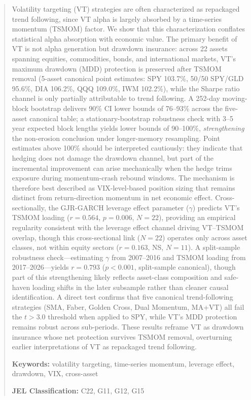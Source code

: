 
\begin{abstract}
\noindent
Volatility targeting (VT) strategies are often characterized as repackaged trend following, since VT alpha is largely absorbed by a time-series momentum (TSMOM) factor. We show that this characterization conflates statistical alpha absorption with economic value. The primary benefit of VT is not alpha generation but drawdown insurance: across 22 assets spanning equities, commodities, bonds, and international markets, VT's maximum drawdown (MDD) protection is preserved after TSMOM removal (5-asset canonical point estimates: SPY 103.7\%, 50/50 SPY/GLD 95.6\%, DIA 106.2\%, QQQ 109.0\%, IWM 102.2\%), while the Sharpe ratio channel is only partially attributable to trend following. A 252-day moving-block bootstrap delivers 90\% CI lower bounds of 76--93\% across the five-asset canonical table; a stationary-bootstrap robustness check with 3--5 year expected block lengths yields lower bounds of 90--100\%, \emph{strengthening} the non-erosion conclusion under longer-memory resampling. Point estimates above 100\% should be interpreted cautiously: they indicate that hedging does not damage the drawdown channel, but part of the incremental improvement can arise mechanically when the hedge trims exposure during momentum-crash rebound windows. The mechanism is therefore best described as VIX-level-based position sizing that remains distinct from return-direction momentum in net economic effect. Cross-sectionally, the GJR-GARCH leverage effect parameter ($\gamma$) predicts VT's TSMOM loading ($r = 0.564$, $p = 0.006$, $N = 22$), providing an empirical regularity consistent with the leverage effect channel driving VT--TSMOM overlap, though this cross-sectional link ($N = 22$) operates only across asset classes, not within equity sectors ($r = 0.163$, NS, $N = 11$). A split-sample robustness check---estimating $\gamma$ from 2007--2016 and TSMOM loading from 2017--2026---yields $r = 0.793$ ($p < 0.001$, split-sample canonical), though part of this strengthening likely reflects asset-class composition and safe-haven loading shifts in the later subsample rather than cleaner causal identification. A direct test confirms that five canonical trend-following strategies (SMA, Faber, Golden Cross, Dual Momentum, MA+VT) all fail the \citet{harvey2016} $t > 3.0$ threshold when applied to SPY, while VT's MDD protection remains robust across sub-periods. These results reframe VT as drawdown insurance whose net protection survives TSMOM removal, overturning earlier interpretations of VT as repackaged trend following.

\medskip
\noindent
\textbf{Keywords:} volatility targeting, time-series momentum, leverage effect, drawdown, VIX, cross-asset

\medskip
\noindent
\textbf{JEL Classification:} C22, G11, G12, G15
\end{abstract}


